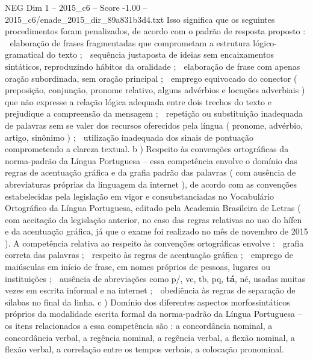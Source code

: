 \begin{textsample}{NEG Dim 1 – 2015\_c6 – Score -1.00 – 2015\_c6/enade\_2015\_dir\_89a831b3d4.txt}
Isso significa que os seguintes procedimentos foram penalizados, de acordo com o padrão de resposta proposto :  elaboração de frases fragmentadas que comprometam a estrutura lógico-gramatical do texto ;  sequência justaposta de ideias sem encaixamentos sintáticos, reproduzindo hábitos da oralidade ;  elaboração de frase com apenas oração subordinada, sem oração principal ;  emprego equivocado do conector ( preposição, conjunção, pronome relativo, alguns advérbios e locuções adverbiais ) que não expresse a relação lógica adequada entre dois trechos do texto e prejudique a compreensão da mensagem ;  repetição ou substituição inadequada de palavras sem se valer dos recursos oferecidos pela língua ( pronome, advérbio, artigo, sinônimo ) ;  utilização inadequada dos sinais de pontuação comprometendo a clareza textual. b ) Respeito às convenções ortográficas da norma-padrão da Língua Portuguesa – essa competência envolve o domínio das regras de acentuação gráfica e da grafia padrão das palavras ( com ausência de abreviaturas próprias da linguagem da internet ), de acordo com as convenções estabelecidas pela legislação em vigor e consubstanciadas no Vocabulário Ortográfico da Língua Portuguesa, editado pela Academia Brasileira de Letras ( com aceitação da legislação anterior, no caso das regras relativas ao uso do hífen e da acentuação gráfica, já que o exame foi realizado no mês de novembro de 2015 ).
A competência relativa ao respeito às convenções ortográficas envolve :  grafia correta das palavras ;  respeito às regras de acentuação gráfica ;  emprego de maiúsculas em início de frase, em nomes próprios de pessoas, lugares ou instituições ;  ausência de abreviações como p/, vc, tb, pq, \textbf{tá}, né, usadas muitas vezes em escrita informal e na internet ;  obediência às regras de separação de sílabas no final da linha. c ) Domínio dos diferentes aspectos morfossintáticos próprios da modalidade escrita formal da norma-padrão da Língua Portuguesa – os itens relacionados a essa competência são : a concordância nominal, a concordância verbal, a regência nominal, a regência verbal, a flexão nominal, a flexão verbal, a correlação entre os tempos verbais, a colocação pronominal.

\end{textsample}
